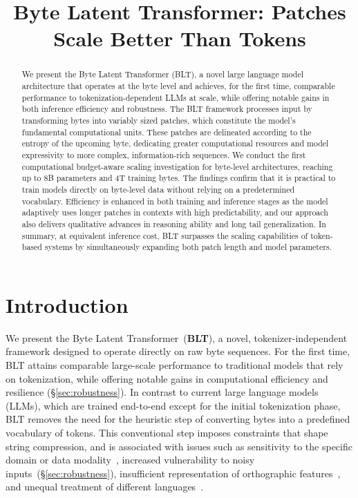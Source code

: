 \title{Byte Latent Transformer: Patches Scale Better Than Tokens}

\begin{abstract}
We present the Byte Latent Transformer (\textsc{BLT}), a novel large language model architecture that operates at the byte level and achieves, for the first time, comparable performance to tokenization-dependent LLMs at scale, while offering notable gains in both inference efficiency and robustness. The \textsc{BLT} framework processes input by transforming bytes into variably sized patches, which constitute the model's fundamental computational units. These patches are delineated according to the entropy of the upcoming byte, dedicating greater computational resources and model expressivity to more complex, information-rich sequences. We conduct the first computational budget-aware scaling investigation for byte-level architectures, reaching up to 8B parameters and 4T training bytes. The findings confirm that it is practical to train models directly on byte-level data without relying on a predetermined vocabulary. Efficiency is enhanced in both training and inference stages as the model adaptively uses longer patches in contexts with high predictability, and our approach also delivers qualitative advances in reasoning ability and long tail generalization. In summary, at equivalent inference cost, \textsc{BLT} surpasses the scaling capabilities of token-based systems by simultaneously expanding both patch length and model parameters.
\end{abstract}

\section{Introduction}
\label{section:intro}

We present the Byte Latent Transformer~(\textbf{BLT}), a novel, tokenizer-independent framework designed to operate directly on raw byte sequences. For the first time, BLT attains comparable large-scale performance to traditional models that rely on tokenization, while offering notable gains in computational efficiency and resilience (\S\ref{sec:robustness}). In contrast to current large language models (LLMs), which are trained end-to-end except for the initial tokenization phase, BLT removes the need for the heuristic step of converting bytes into a predefined vocabulary of tokens. This conventional step imposes constraints that shape string compression, and is associated with issues such as sensitivity to the specific domain or data modality~\citep{dagangetting}, increased vulnerability to noisy inputs~(\S\ref{sec:robustness}), insufficient representation of orthographic features~\citep{edman2024cute}, and unequal treatment of different languages~\citep{liang2023xlm,petrov2024language,limisiewicz2024myte}.

